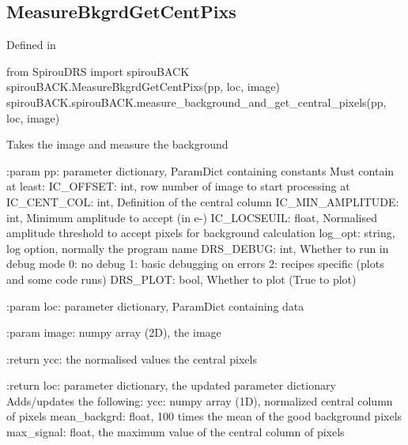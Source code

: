 \begin{minipage}{\textwidth}
\subsection{MeasureBkgrdGetCentPixs}

Defined in \spirouBACK{}

\begin{pythonbox}
from SpirouDRS import spirouBACK
spirouBACK.MeasureBkgrdGetCentPixs(pp, loc, image)
spirouBACK.spirouBACK.measure_background_and_get_central_pixels(pp, loc, image)
\end{pythonbox}

\begin{pythondocstring}
Takes the image and measure the background

:param pp: parameter dictionary, ParamDict containing constants
        Must contain at least:
            IC_OFFSET: int, row number of image to start processing at
            IC_CENT_COL: int, Definition of the central column
            IC_MIN_AMPLITUDE: int, Minimum amplitude to accept (in e-)
            IC_LOCSEUIL: float, Normalised amplitude threshold to accept
                         pixels for background calculation
            log_opt: string, log option, normally the program name
            DRS_DEBUG: int, Whether to run in debug mode
                            0: no debug
                            1: basic debugging on errors
                            2: recipes specific (plots and some code runs)
            DRS_PLOT: bool, Whether to plot (True to plot)

:param loc: parameter dictionary, ParamDict containing data

:param image: numpy array (2D), the image

:return ycc: the normalised values the central pixels

:return loc: parameter dictionary, the updated parameter dictionary
        Adds/updates the following:
            ycc: numpy array (1D), normalized central column of pixels
            mean_backgrd: float, 100 times the mean of the good background
                          pixels
            max_signal: float, the maximum value of the central column of
                        pixels
\end{pythondocstring}
\end{minipage}
